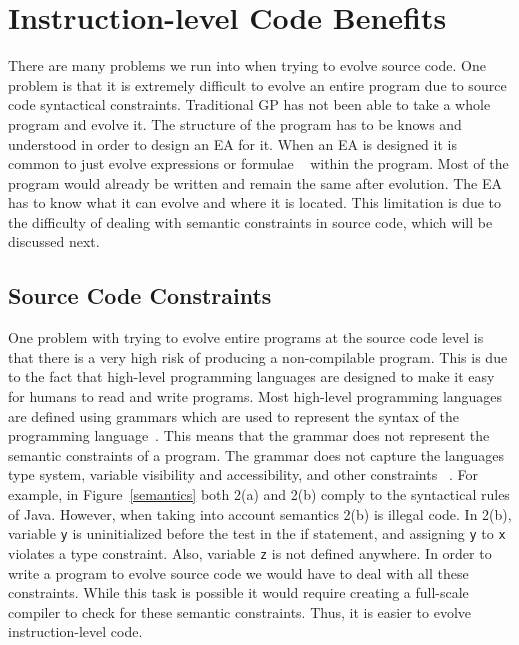 \documentclass{sig-alternate}
\begin{document}
\section{Instruction-level Code Benefits}

There are many problems we run into when trying to evolve source code. One problem is that it is extremely difficult to evolve an entire program due to source code syntactical constraints. Traditional GP has not been able to take a whole program and evolve it. The structure of the program has to be knows and understood in order to design an EA for it. When an EA is designed it is common to just evolve expressions or formulae ~\cite{FINCH:2011} within the program. Most of the program would already be written and remain the same after evolution. The EA has to know what it can evolve and where it is located. This limitation is due to the difficulty of dealing with semantic constraints in source code, which will be discussed next.

\subsection{Source Code Constraints}
One problem with trying to evolve entire programs at the source code level is that there is a very high risk of producing a non-compilable program. This is due to the fact that high-level programming languages are designed to make it easy for humans to read and write programs. Most high-level programming languages are defined using grammars which are used to represent the syntax of the programming language~\cite{Oracle:2013,Assembly:2010}. This means that the grammar does not represent the semantic constraints of a program. The grammar does not capture the languages type system, variable visibility and accessibility, and other constraints ~\cite{FINCH:2011}. For example, in Figure~\ref{semantics} both 2(a) and 2(b) comply to the syntactical rules of Java. However, when taking into account semantics 2(b) is illegal code. In 2(b), variable \texttt{y} is uninitialized before the test in the if statement, and assigning \texttt{y} to \texttt{x} violates a type constraint. Also, variable \texttt{z} is not defined anywhere.  In order to write a program to evolve source code we would have to deal with all these constraints. While this task is possible it would require creating a full-scale compiler to check for these semantic constraints. Thus, it is easier to evolve instruction-level code. \par
\end{document}
